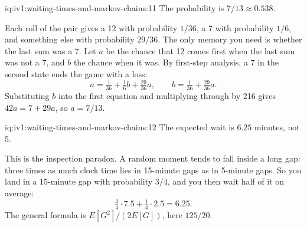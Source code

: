\begin{solution}{iq:iv1:waiting-times-and-markov-chains:11}
The probability is $7/13 \approx 0.538$.

Each roll of the pair gives a 12 with probability $1/36$, a 7 with probability $1/6$, and something else with probability $29/36$. The only memory you need is whether the last sum was a 7. Let $a$ be the chance that 12 comes first when the last sum was not a 7, and $b$ the chance when it was. By first-step analysis, a 7 in the second state ends the game with a loss:
\[
a = \tfrac{1}{36} + \tfrac16 b + \tfrac{29}{36} a, \qquad b = \tfrac{1}{36} + \tfrac{29}{36} a.
\]
Substituting $b$ into the first equation and multiplying through by 216 gives $42a = 7 + 29a$, so $a = 7/13$.

\end{solution}

\begin{solution}{iq:iv1:waiting-times-and-markov-chains:12}
The expected wait is $6.25$ minutes, not 5.

This is the inspection paradox. A random moment tends to fall inside a long gap: three times as much clock time lies in 15-minute gaps as in 5-minute gaps. So you land in a 15-minute gap with probability $3/4$, and you then wait half of it on average:
\[
\tfrac34 \cdot 7.5 + \tfrac14 \cdot 2.5 = 6.25.
\]
The general formula is $E[G^2]/(2E[G])$, here $125/20$.

\end{solution}

